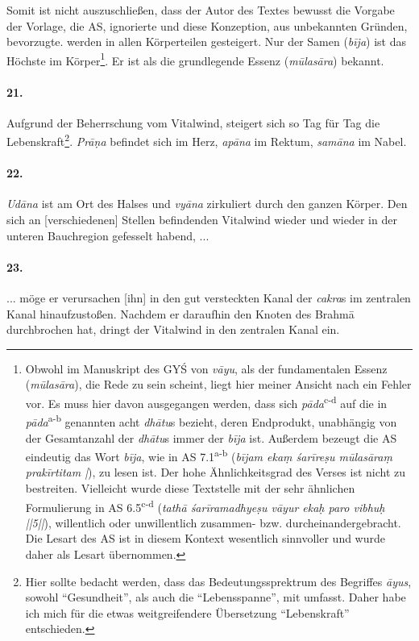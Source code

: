 \documentclass[a4paper,12pt]{article}
\begin{document}
{  Somit ist nicht auszuschließen, dass der Autor des Textes bewusst die Vorgabe der Vorlage, die AS, ignorierte und diese Konzeption, aus unbekannten Gründen, bevorzugte.}  werden in allen Körperteilen gesteigert. Nur der Samen (\textit{bīja}) ist das Höchste im Körper\footnote{Obwohl im Manuskript des GYŚ von \textit{vāyu}, als der fundamentalen Essenz (\textit{mūlasāra}), die Rede zu sein scheint, liegt hier meiner Ansicht nach ein Fehler vor. Es muss hier davon ausgegangen werden, dass sich \textit{pāda}\textsuperscript{c-d} auf die in \textit{pāda}\textsuperscript{a-b} genannten acht \textit{dhātu}s bezieht, deren Endprodukt, unabhängig von der Gesamtanzahl der \textit{dhātu}s immer der \textit{bīja} ist. Außerdem bezeugt die AS eindeutig das Wort \textit{bīja}, wie in AS 7.1\textsuperscript{a-b} (\textit{bījam ekaṃ śarīreṣu mūlasāraṃ prakīrtitam |}), zu lesen ist. Der hohe Ähnlichkeitsgrad des Verses ist nicht zu bestreiten. Vielleicht wurde diese Textstelle mit der sehr ähnlichen Formulierung in AS 6.5\textsuperscript{c-d} (\textit{tathā śarīramadhyeṣu vāyur ekaḥ paro vibhuḥ ||5||}), willentlich oder unwillentlich zusammen- bzw. durcheinandergebracht. Die Lesart des AS ist in diesem Kontext wesentlich sinnvoller und wurde daher als Lesart übernommen.}. Er ist als die grundlegende Essenz (\textit{mūlasāra}) bekannt. 

\paragraph{21.} Aufgrund der Beherrschung vom Vitalwind, steigert sich so Tag für Tag die Lebenskraft\footnote{Hier sollte bedacht werden, dass das Bedeutungssprektrum des Begriffes \textit{āyus}, sowohl ``Gesundheit'', als auch die ``Lebensspanne'', mit umfasst. Daher habe ich mich für die etwas weitgreifendere Übersetzung ``Lebenskraft'' entschieden.}. \textit{Prāṇa} befindet sich im Herz, \textit{apāna} im Rektum, \textit{samāna} im Nabel. 

\paragraph{22.} \textit{Udāna} ist am Ort des Halses und \textit{vyāna} zirkuliert durch den ganzen Körper. Den sich an [verschiedenen] Stellen befindenden Vitalwind wieder und wieder in der unteren Bauchregion gefesselt habend, ...

\paragraph{23.} ... möge er verursachen [ihn] in den gut versteckten Kanal der \textit{cakra}s im zentralen Kanal hinaufzustoßen. Nachdem er daraufhin den Knoten des Brahmā durchbrochen hat, dringt der Vitalwind in den zentralen Kanal ein.
\end{document}
